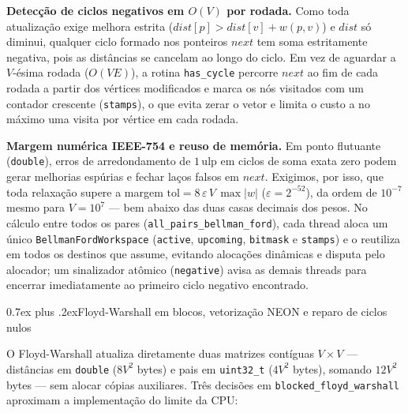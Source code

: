 \documentclass[a4paper,11pt]{article}
\makeatletter
\newcommand{\cod}[1]{\texttt{#1}}
\newcommand{\dist}{\mathit{dist}}
\newcommand{\nxt}{\mathit{next}}
\renewcommand\subsection{\@startsection{subsection}{2}{\z@}{-2.0ex plus -.5ex minus -.2ex}%
  {0.7ex plus .2ex}{\normalfont\normalsize\bfseries\color{ink}}}
\makeatother
\begin{document}
\textbf{Detecção de ciclos negativos em $O(V)$ por rodada.} Como toda atualização exige melhora estrita ($\dist[p] > \dist[v] + w(p,v)$) e $\dist$ só diminui, qualquer ciclo formado nos ponteiros $\nxt$ tem soma estritamente negativa, pois as distâncias se cancelam ao longo do ciclo. Em vez de aguardar a $V$-ésima rodada ($O(VE)$), a rotina \cod{has\_cycle} percorre $\nxt$ ao fim de cada rodada a partir dos vértices modificados e marca os nós visitados com um contador crescente (\cod{stamps}), o que evita zerar o vetor e limita o custo a no máximo uma visita por vértice em cada rodada.

\textbf{Margem numérica IEEE-754 e reuso de memória.} Em ponto flutuante (\cod{double}), erros de arredondamento de $1\,\text{ulp}$ em ciclos de soma exata zero podem gerar melhorias espúrias e fechar laços falsos em $\nxt$. Exigimos, por isso, que toda relaxação supere a margem $\text{tol} = 8\,\varepsilon\,V\,\max|w|$ ($\varepsilon = 2^{-52}$), da ordem de $10^{-7}$ mesmo para $V=10^7$ — bem abaixo das duas casas decimais dos pesos. No cálculo entre todos os pares (\cod{all\_pairs\_bellman\_ford}), cada thread aloca um único \cod{BellmanFordWorkspace} (\cod{active}, \cod{upcoming}, \cod{bitmask} e \cod{stamps}) e o reutiliza em todos os destinos que assume, evitando alocações dinâmicas e disputa pelo alocador; um sinalizador atômico (\cod{negative}) avisa as demais threads para encerrar imediatamente ao primeiro ciclo negativo encontrado.

\subsection{Floyd-Warshall em blocos, vetorização NEON e reparo de ciclos nulos}

O Floyd-Warshall atualiza diretamente duas matrizes contíguas $V\times V$ — distâncias em \cod{double} ($8V^2$ bytes) e pais em \cod{uint32\_t} ($4V^2$ bytes), somando $12V^2$ bytes — sem alocar cópias auxiliares. Três decisões em \cod{blocked\_floyd\_warshall} aproximam a implementação do limite da CPU:
\end{document}
